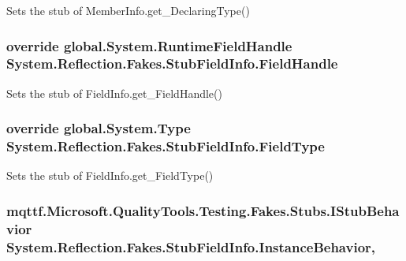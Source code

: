 Sets the stub of Member\-Info.\-get\-\_\-\-Declaring\-Type()

\hypertarget{class_system_1_1_reflection_1_1_fakes_1_1_stub_field_info_ab1dea680d27aa215adea697c3f34c191}{
\subsubsection[{Field\-Handle}]{\setlength{\rightskip}{0pt plus 5cm}override global.\-System.\-Runtime\-Field\-Handle System.\-Reflection.\-Fakes.\-Stub\-Field\-Info.\-Field\-Handle\hspace{0.3cm}{\ttfamily [get]}}}\label{class_system_1_1_reflection_1_1_fakes_1_1_stub_field_info_ab1dea680d27aa215adea697c3f34c191}


Sets the stub of Field\-Info.\-get\-\_\-\-Field\-Handle()

\hypertarget{class_system_1_1_reflection_1_1_fakes_1_1_stub_field_info_afca4904abed8a1e55f51ec9916ee518b}{
\subsubsection[{Field\-Type}]{\setlength{\rightskip}{0pt plus 5cm}override global.\-System.\-Type System.\-Reflection.\-Fakes.\-Stub\-Field\-Info.\-Field\-Type\hspace{0.3cm}{\ttfamily [get]}}}\label{class_system_1_1_reflection_1_1_fakes_1_1_stub_field_info_afca4904abed8a1e55f51ec9916ee518b}


Sets the stub of Field\-Info.\-get\-\_\-\-Field\-Type()

\hypertarget{class_system_1_1_reflection_1_1_fakes_1_1_stub_field_info_a0f1cf8e8a06781802dac06a3578b85e5}{
\subsubsection[{Instance\-Behavior}]{\setlength{\rightskip}{0pt plus 5cm}mqttf.\-Microsoft.\-Quality\-Tools.\-Testing.\-Fakes.\-Stubs.\-I\-Stub\-Behavior System.\-Reflection.\-Fakes.\-Stub\-Field\-Info.\-Instance\-Behavior\hspace{0.3cm}{\ttfamily [get]}, {\ttfamily [set]}}}\label{class_system_1_1_reflection_1_1_fakes_1_1_stub_field_info_a0f1cf8e8a06781802dac06a3578b85e5}


